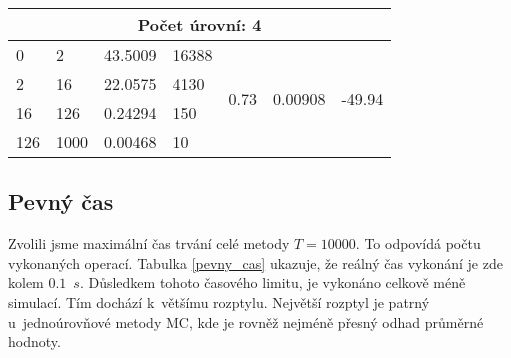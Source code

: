 \documentclass[FM, RP]{tulthesis}
\begin{document}
\begin{table}[!htb]
\begin{threeparttable}
\begin{tabular}{|l|l|l|l|l|l|l|}
\multicolumn{7}{|c|}{\textbf{Počet úrovní: 4}} \\ \hline
0 & 2 & 43.5009 & 16388 & \multicolumn{1}{c|}{\multirow{4}{*}{0.73}} & \multicolumn{1}{c|}{\multirow{4}{*}{0.00908}} & \multicolumn{1}{c|}{\multirow{4}{*}{-49.94}} \\ \cline{1-4}
2 & 16 & 22.0575 & 4130 &  &  &  \\ \cline{1-4}
16 & 126 & 0.24294 & 150 &  &  &  \\ \cline{1-4}
126 & 1000 & 0.00468 & 10 &  &  &  \\ \hline
\end{tabular}
\end{threeparttable}
\end{table}


\newpage
\subsection{Pevný čas}
Zvolili jsme maximální čas trvání celé metody $T = 10000$. To odpovídá počtu vykonaných operací. Tabulka \ref{pevny_cas} ukazuje, že reálný čas vykonání je zde kolem $0.1$~$s$. Důsledkem tohoto časového limitu, je vykonáno celkově méně simulací. Tím dochází k~většímu rozptylu. Největší rozptyl je patrný u~jednoúrovňové metody MC, kde je rovněž nejméně přesný odhad průměrné hodnoty. 
\end{document}
